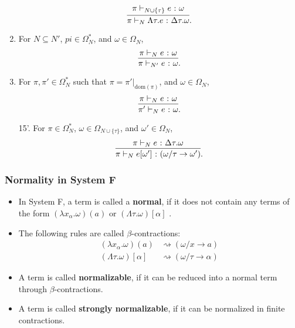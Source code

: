 \begin{frame}[allowframebreaks]
\begin{enumerate}
        \[
        \infer{\pi \vdash_N \Lambda\tau. e \colon \Delta\tau. \omega}{\pi \vdash_{N \cup \{\tau\}} e \colon \omega}.
        \]
        \item For $N \subseteq N'$, $pi \in \Omega^*_N$, and $\omega \in \Omega_N$,
        \[
        \infer{\pi \vdash_{N'} e \colon \omega}{\pi \vdash_N e \colon \omega}.
        \]
        \item For $\pi, \pi' \in \Omega^*_N$ such that $\pi = \pi'|_{\mathrm{dom}(\pi)}$, and $\omega \in \Omega_N$,
        \[
        \infer{\pi' \vdash_N e \colon \omega}{\pi \vdash_N e \colon \omega}.
        \]
    \end{enumerate}
    
    \begin{itemize}
        \item [15'.] For $\pi \in \Omega^*_N$, $\omega \in \Omega_{N \cup \{\tau\}}$, and $\omega' \in \Omega_N$,
        \[
        \infer{\pi \vdash_N e[\omega'] \colon (\omega / \tau \rightarrow \omega')}{\pi \vdash_N e \colon \Delta\tau.\omega}.
        \]
    \end{itemize}
\end{frame}

\begin{frame}[fragile]
    \frametitle{Normality in System F}
  
    \begin{itemize}
        \item In System F, a term is called a \textbf{normal}, if it does not contain any terms of the form $(\lambda x_\alpha. \omega)(a)$ or $(\Lambda \tau. \omega)[\alpha]$  \cite{capretta_valentini_1999}.
        \item The following rules are called $\beta$-contractions:
        \begin{align*}
            (\lambda x_\alpha. \omega)(a) &\rightsquigarrow (\omega / x \rightarrow a) \\
            (\Lambda \tau. \omega)[\alpha] &\rightsquigarrow (\omega / \tau \rightarrow \alpha)
        \end{align*}
        \item A term is called \textbf{normalizable}, if it can be reduced into a normal term through $\beta$-contractions.
        \item A term is called \textbf{strongly normalizable}, if it can be normalized in finite contractions.
    \end{itemize}
\end{frame}

